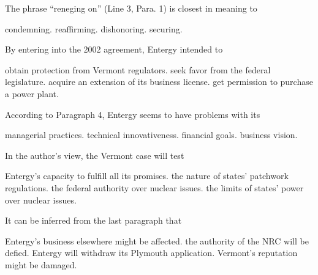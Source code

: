 \item The phrase ``reneging on'' (Line 3, Para. 1) is closest in meaning to
\begin{tasks}
	\task condemning.
	\task reaffirming.
	\task dishonoring.
	\task securing.
\end{tasks}
\item By entering into the 2002 agreement, Entergy intended to
\begin{tasks}
	\task obtain protection from Vermont regulators.
	\task seek favor from the federal legislature.
	\task acquire an extension of its business license.
	\task get permission to purchase a power plant.
\end{tasks}
\item According to Paragraph 4, Entergy seems to have problems with its
\begin{tasks}
	\task managerial practices.
	\task technical innovativeness.
	\task financial goals.
	\task business vision.
\end{tasks}
\item In the author's view, the Vermont case will test
\begin{tasks}
	\task Entergy's capacity to fulfill all its promises.
	\task the nature of states' patchwork regulations.
	\task the federal authority over nuclear issues.
	\task the limits of states' power over nuclear issues.
\end{tasks}
\item It can be inferred from the last paragraph that
\begin{tasks}
	\task Entergy's business elsewhere might be affected.
	\task the authority of the NRC will be defied.
	\task Entergy will withdraw its Plymouth application.
	\task Vermont's reputation might be damaged.
\end{tasks}